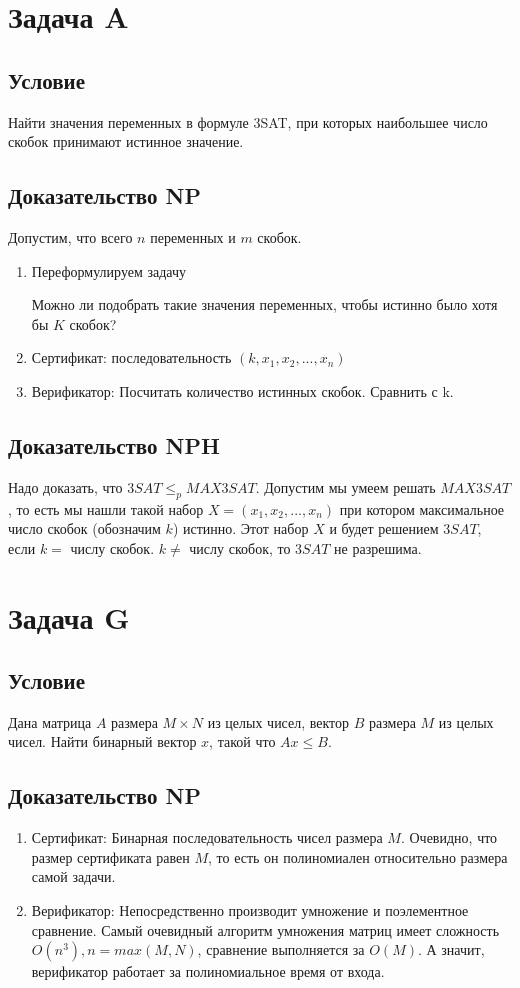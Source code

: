 \documentclass{article}
\begin{document}
\section*{Задача A} 

\subsection*{Условие} 
Найти значения переменных в формуле 3SAT, при которых наибольшее число
скобок принимают истинное значение.
\subsection*{Доказательство NP}
Допустим, что всего $n$ переменных и $m$ скобок.
\begin{enumerate}
\item Переформулируем задачу

Можно ли подобрать такие значения переменных, чтобы истинно было хотя бы $K$ скобок?

\item Сертификат: последовательность $(k, x_1, x_2, ..., x_n)$
\item Верификатор: Посчитать количество истинных скобок. Сравнить с k.

\end{enumerate}
\subsection*{Доказательство NPH}
Надо доказать, что $3SAT \leq_p MAX3SAT$.  Допустим мы умеем решать $MAX3SAT$, то есть мы нашли такой набор $X = (x_1, x_2, ..., x_n)$ при котором максимальное число скобок (обозначим $k$) истинно. Этот набор $X$ и будет решением $3SAT$, если $k =$ числу скобок. $k \neq$ числу скобок, то $3SAT$ не разрешима.
\newpage

\section*{Задача G} 

\subsection*{Условие} 
Дана матрица $A$ размера $M \times N$ из целых чисел, вектор $B$ размера $M$ из целых чисел. Найти бинарный вектор $x$, такой что $Ax \leq B$.

\subsection*{Доказательство NP}
\begin{enumerate}
\item Сертификат: Бинарная последовательность чисел размера $M$. Очевидно, что размер сертификата равен $M$, то есть он полиномиален относительно размера самой задачи.
\item Верификатор: Непосредственно производит умножение и поэлементное сравнение. Самый очевидный алгоритм умножения матриц имеет сложность $O(n^3), n = max(M, N)$, сравнение выполняется за $O(M)$. А значит, верификатор работает за полиномиальное время от входа.
\end{enumerate}
\end{document}
